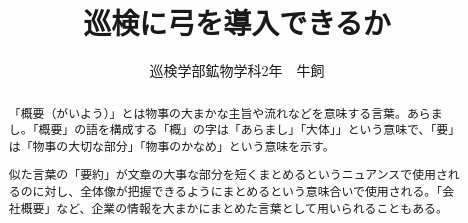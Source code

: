 \documentclass{jsarticle}
\title{巡検に弓を導入できるか}
\author{巡検学部鉱物学科2年　牛飼}
\begin{document}
   \maketitle　%
   \begin{abstract}
      「概要（がいよう）」とは物事の大まかな主旨や流れなどを意味する言葉。あらまし。「概要」の語を構成する「概」の字は「あらまし」「大体」」という意味で、「要」は「物事の大切な部分」「物事のかなめ」という意味を示す。

      似た言葉の「要約」が文章の大事な部分を短くまとめるというニュアンスで使用されるのに対し、全体像が把握できるようにまとめるという意味合いで使用される。「会社概要」など、企業の情報を大まかにまとめた言葉として用いられることもある。\cite{gaiyo}
   \end{abstract}
\end{document}
